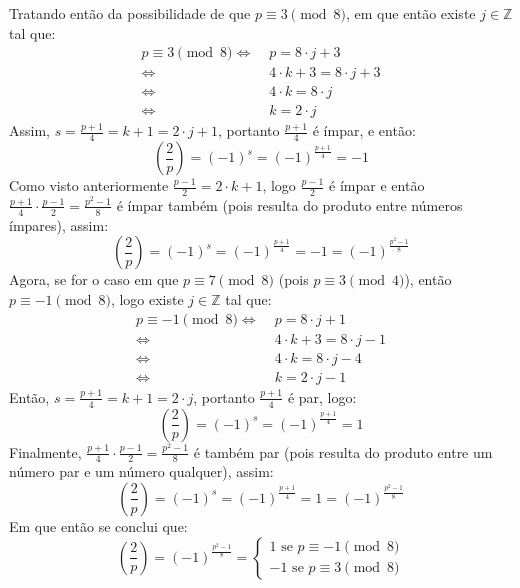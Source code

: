 Tratando então da possibilidade de que $p \equiv 3 \pmod{8}$, em que então existe  $j \in \mathbb{Z}$ tal que:
\begin{align*}
    p \equiv 3 \pmod{8}
    \Longleftrightarrow \; & p = 8 \cdot j + 3
    \\
    \Longleftrightarrow \; & 4 \cdot k + 3 = 8 \cdot j + 3
    \\
    \Longleftrightarrow \; & 4 \cdot k = 8 \cdot j 
    \\
    \Longleftrightarrow \; & k = 2 \cdot j
\end{align*}
Assim, $s = \frac{p+1}{4} = k + 1 = 2 \cdot j + 1 $, portanto $\frac{p+1}{4}$ é ímpar, e então:
\begin{equation*}
    \left(\frac{2}{p} \right) = (-1)^s = (-1)^{\frac{p+1}{4}} = -1
\end{equation*}
Como visto anteriormente $\frac{p-1}{2} = 2 \cdot k + 1$, logo $\frac{p-1}{2}$ é ímpar e então $\frac{p+1}{4} \cdot \frac{p-1}{2} = \frac{p^2-1}{8}$ é ímpar também (pois resulta do produto entre números ímpares), assim:
\begin{equation*}
    \left(\frac{2}{p} \right) = (-1)^s = (-1)^{\frac{p+1}{4}} = -1 = (-1)^{\frac{p^2-1}{8}}
\end{equation*}
Agora, se for o caso em que $p \equiv 7 \pmod{8}$ (pois $p \equiv 3 \pmod{4}$), então $p \equiv -1 \pmod{8}$, logo existe $j \in \mathbb{Z}$ tal que:
\begin{align*}
    p \equiv -1 \pmod{8}
    \Longleftrightarrow \; & p = 8 \cdot j + 1
    \\
    \Longleftrightarrow \; & 4 \cdot k + 3 = 8 \cdot j -1
    \\
    \Longleftrightarrow \; & 4 \cdot k = 8 \cdot j - 4
    \\
    \Longleftrightarrow \; & k = 2 \cdot j - 1
\end{align*}
Então, $s = \frac{p+1}{4} = k + 1 = 2 \cdot j$, portanto $\frac{p+1}{4}$ é par, logo:
\begin{equation*}
    \left(\frac{2}{p} \right) = (-1)^s = (-1)^{\frac{p+1}{4}} = 1
\end{equation*}
 Finalmente, $\frac{p+1}{4} \cdot \frac{p-1}{2} = \frac{p^2-1}{8}$ é também par (pois resulta do produto entre um número par e um número qualquer), assim:
\begin{equation*}
    \left(\frac{2}{p} \right) = (-1)^s = (-1)^{\frac{p+1}{4}} = 1 = (-1)^{\frac{p^2-1}{8}}
\end{equation*} 
Em que então se conclui que:
\begin{equation} \label{eq:casesrecip2}
    \left(\frac{2}{p} \right) = (-1)^{\frac{p^2 - 1}{8}} = \begin{cases}
            1 \text{ se $p \equiv -1 \pmod{8}$}
            \\
            -1 \text{ se $p \equiv 3 \pmod{8}$}
            \end{cases}
\end{equation}
